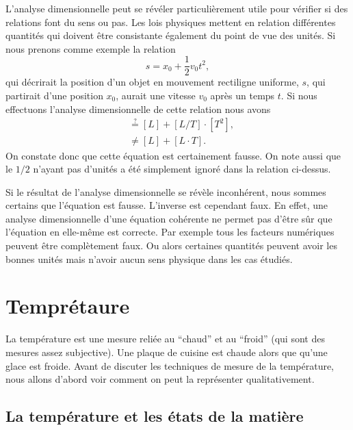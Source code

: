\documentclass[a4paper,12pt]{book}
\begin{document}
L'analyse dimensionnelle peut se révéler particulièrement utile pour vérifier si des relations font du sens ou pas. Les lois physiques
mettent en relation différentes quantités qui doivent être consistante également du point de vue des unités.
Si nous prenons comme exemple la relation
\begin{equation}
 s=x_0+\frac{1}{2}v_0 t^2,
\end{equation}
qui décrirait la position d'un objet en mouvement rectiligne uniforme, $s$, qui partirait d'une position $x_0$,
aurait une vitesse $v_0$ après un temps $t$. Si nous effectuons l'analyse dimensionnelle de cette relation nous avons
\begin{align}
 [L]&\stackrel{?}{=}[L]+[L/T]\cdot [T^2],\nonumber\\
 &\neq[L]+[L\cdot T].
\end{align}
On constate donc que cette équation est certainement fausse. On note aussi que le $1/2$ n'ayant pas d'unités a été simplement ignoré dans la relation ci-dessus.

Si le résultat de l'analyse dimensionnelle se révèle inconhérent, nous sommes certains que l'équation est fausse. 
L'inverse est cependant faux. En effet, une analyse dimensionnelle d'une équation cohérente ne permet pas d'être sûr que l'équation en elle-même est correcte. 
Par exemple tous les facteurs numériques peuvent être complètement faux. Ou alors certaines quantités peuvent avoir les bonnes unités mais n'avoir aucun sens physique dans
les cas étudiés.

\chapter{Temprétaure}

La température est une mesure reliée au ``chaud'' et au ``froid'' (qui sont des mesures assez subjective). Une plaque de cuisine est chaude alors que 
qu'une glace est froide. Avant de discuter les techniques de mesure de la température, nous allons d'abord voir comment on peut la représenter qualitativement.

\section{La température et les états de la matière}
\end{document}
